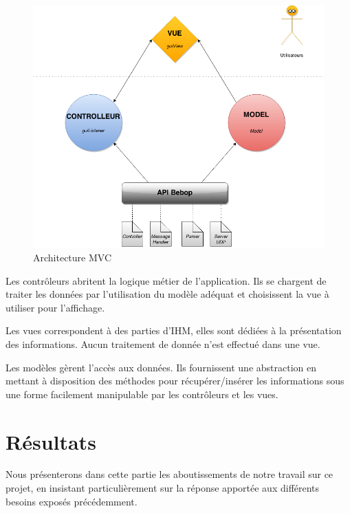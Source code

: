 \documentclass[12pt, openany]{report}
\begin{document}
\begin{figure}[!h]
  \centering
  \includegraphics[width=\textwidth]{figures/ayylmao.png}
  \caption{Architecture MVC}
  \label{fig:schema}
\end{figure}
Les contrôleurs abritent la logique métier de l’application. Ils se chargent de traiter les données par l’utilisation du modèle adéquat et choisissent la vue à utiliser pour l’affichage.

Les vues correspondent à des parties d’IHM, elles sont dédiées à la présentation des informations. Aucun traitement de donnée n’est effectué dans une vue.

Les modèles gèrent l’accès aux données. Ils fournissent une abstraction en mettant à disposition des méthodes pour récupérer/insérer les informations sous une forme facilement manipulable par les contrôleurs et les vues.



\chapter{Résultats}
Nous présenterons dans cette partie les aboutissements de notre travail sur ce projet, en insistant particulièrement sur la réponse apportée aux différents besoins exposés précédemment.
\end{document}
